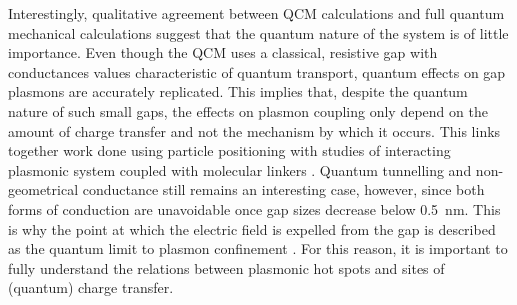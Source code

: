 \documentclass{article}
\begin{document}



Interestingly, qualitative agreement between QCM calculations and full quantum mechanical calculations suggest that the quantum nature of the system is of little importance. Even though the QCM uses a classical, resistive gap with conductances values characteristic of quantum transport, quantum effects on gap plasmons are accurately replicated. This implies that, despite the quantum nature of such small gaps, the effects on plasmon coupling only depend on the amount of charge transfer and not the mechanism by which it occurs. This links together work done using particle positioning \cite{savage2012, scholl2013} with studies of interacting plasmonic system coupled with molecular linkers \cite{tan2014, cha2014, benz2014}. Quantum tunnelling and non-geometrical conductance still remains an interesting case, however, since both forms of conduction are unavoidable once gap sizes decrease below \SI{0.5}{nm}. This is why the point at which the electric field is expelled from the gap is described as the quantum limit to plasmon confinement \cite{savage2012}. For this reason, it is important to fully understand the relations between plasmonic hot spots and sites of (quantum) charge transfer.
\end{document}
